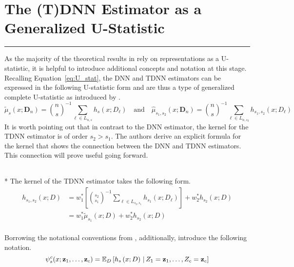 \section{The (T)DNN Estimator as a Generalized U-Statistic}
\hrule

As the majority of the theoretical results in \citet{demirkaya_optimal_2024} rely on representations as a U-statistic, it is helpful to introduce additional concepts and notation at this stage.
Recalling Equation~\ref{eq:U_stat}, the DNN and TDNN estimators can be expressed in the following U-statistic form and are thus a type of generalized complete U-statistic as introduced by \citet{peng_rates_2022}.
\begin{equation}
	\tilde{\mu}_{s}(x; \mathbf{D}_n)
	= \binom{n}{s}^{-1} \sum_{\ell \in L_{n,s}} h_{s}(x; D_{\ell})
	\quad \text{and} \quad
	\hat{\mu}_{s_1, s_2}(x; \mathbf{D}_n)
	= \binom{n}{s}^{-1} \sum_{\ell \in L_{n,s_2}} h_{s_1, s_2}(x; D_{\ell})
\end{equation}
It is worth pointing out that in contrast to the DNN estimator, the kernel for the TDNN estimator is of order $s_2 > s_1$.
The authors derive an explicit formula for the kernel that shows the connection between the DNN and TDNN estimators.
This connection will prove useful going forward.
\begin{boxD}
	\begin{lem}\label{lem:dem8}\mbox{}\\*
		The kernel of the TDNN estimator takes the following form.
		\begin{equation}
			\begin{aligned}
				h_{s_1, s_2}\left(x; D\right)
				 & = w_{1}^{*}\left[\binom{s_2}{s_1}^{-1}\sum_{\ell \in L_{s_2, s_1}} h_{s_1}\left(x; D_{\ell}\right)\right] + w_{2}^{*} h_{s_2}\left(x; D\right) \\
				 & = w_{1}^{*} \tilde{\mu}_{s_1}\left(x; D\right) + w_{2}^{*} h_{s_2}\left(x; D\right)                                                            \\
			\end{aligned}
		\end{equation}
	\end{lem}
\end{boxD}
Borrowing the notational conventions from \citet{lee_u-statistics_2019}, additionally, introduce the following notation.
\begin{equation}\label{eq:psi_s_c}
	\psi_{s}^{c}(x; \mathbf{z}_{1}, \dotsc, \mathbf{z}_{c})
	= \mathbb{E}_{D}\left[h_{s}\left(x; D\right) \, | \,  Z_1 = \mathbf{z}_{1}, \dotsc, Z_c = \mathbf{z}_{c}\right]
\end{equation}
